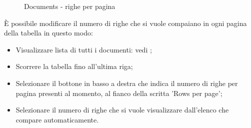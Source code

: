 \documentclass[10pt, a4paper]{article}
\begin{document}
\begin{figure}[H]
    \centering  
    \caption{Documents - righe per pagina}
    \label{img:rowspercol}
\end{figure}
È possibile modificare il numero di righe che si vuole compaiano in ogni pagina della tabella in questo modo:
\begin{itemize}
    \item Visualizzare lista di tutti i documenti: vedi ;
    \item Scorrere la tabella fino all'ultima riga;
    \item Selezionare il bottone in basso a destra che indica il numero di righe per pagina presenti al momento, al fianco della scritta 'Rows per page';
    \item Selezionare il numero di righe che si vuole visualizzare dall'elenco che compare automaticamente.
\end{itemize}
\end{document}
